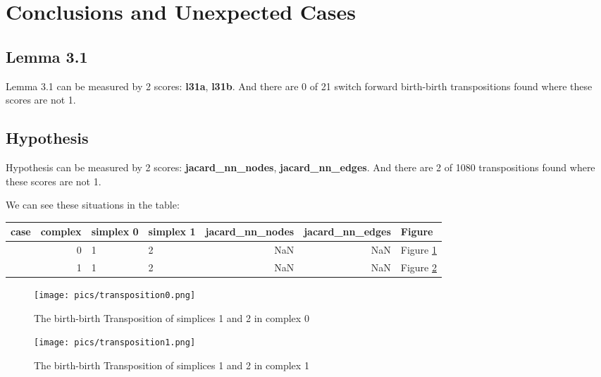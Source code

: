 \documentclass{article}
\begin{document}
\section{Conclusions and Unexpected Cases}

\subsection{Lemma 3.1}
\par Lemma 3.1 can be measured by 2 scores: \textbf{l31a}, \textbf{l31b}.
And there are 0 of 21 switch forward birth-birth transpositions found where these scores are not 1.

\subsection{Hypothesis}
\par Hypothesis can be measured by 2 scores: \textbf{jacard\_nn\_nodes}, \textbf{jacard\_nn\_edges}.
And there are 2 of 1080  transpositions found where these scores are not 1.
\par We can see these situations in the table:
\begin{center}\begin{tabular}{lrllrrl}
\toprule
case & complex & simplex 0 & simplex 1 & jacard\_nn\_nodes & jacard\_nn\_edges & Figure \\
\midrule
& 0 & 1 & 2 & NaN & NaN & Figure \ref{fig:unexpected0} \\
& 1 & 1 & 2 & NaN & NaN & Figure \ref{fig:unexpected1} \\
\bottomrule
\end{tabular}
\end{center}

\begin{figure}[ht]
\centering
\texttt{[image: pics/transposition0.png]}
\caption{The birth-birth Transposition of simplices 1 and 2 in complex 0}
\label{fig:unexpected0}
\end{figure}

\begin{figure}[ht]
\centering
\texttt{[image: pics/transposition1.png]}
\caption{The birth-birth Transposition of simplices 1 and 2 in complex 1}
\label{fig:unexpected1}
\end{figure}
\end{document}
